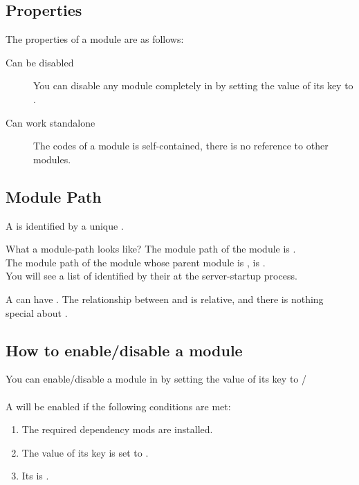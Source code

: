 \subsection{Properties}
The properties of a module are as follows:
\begin{description}
    \item [Can be disabled] You can disable any module completely in  by setting the value of its  key to .
    \item [Can work standalone] The codes of a module is self-contained, there is no reference to other modules.
\end{description}

\subsection{Module Path}
A  is identified by a unique .
\begin{example}{What a module-path looks like?}
    The module path of the module  is . \\
    The module path of the module  whose parent module is , is . \\
    You will see a list of  identified by their  at the server-startup process.
\end{example}
A  can have .
The relationship between  and  is relative, and there is nothing special about .

\subsection{How to enable/disable a module}
You can enable/disable a module in  by setting the value of its  key to /
\\
\\
A  will be enabled if the following conditions are met:
\begin{enumerate}
    \item The required dependency mods are installed.
    \item The value of its  key is set to .
    \item Its  is .
\end{enumerate}

